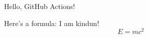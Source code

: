 \documentclass{article}
\begin{document}
Hello, GitHub Actions!

Here's a formula:
I am kindun!
\[
E = mc^2
\]
\end{document}

